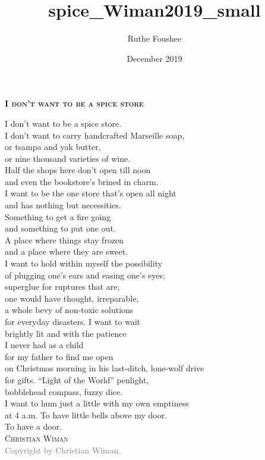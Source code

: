 \documentclass[12pt]{memoir}
\title{spice_Wiman2019_small}
\author{Ruthe Foushee}
\date{December 2019}
\begin{document}
\thispagestyle{empty}
\textbf{\textsc{\large I don't want to be a spice store}}
\vspace{32pt}

I don't want to be a spice store.\\
I don't want to carry handcrafted Marseille soap,\\
or tsampa and yak butter,\\
or nine thousand varieties of wine.\\
Half the shops here don't open till noon\\
and even the bookstore's brined in charm.\\
I want to be the one store that's open all night\\
and has nothing but necessities.\\
Something to get a fire going\\
and something to put one out.\\
A place where things stay frozen\\
and a place where they are sweet.\\
I want to hold within myself the possibility\\
of plugging one's ears and easing one's eyes;\\
superglue for ruptures that are,\\
one would have thought, irreparable,\\
a whole bevy of non-toxic solutions\\
for everyday disasters. I want to wait\\
brightly lit and with the patience\\
I never had as a child\\
for my father to find me open\\
on Christmas morning in his last-ditch, lone-wolf drive\\
for gifts. ``Light of the World'' penlight,\\
bobblehead compass, fuzzy dice.\\
I want to hum just a little with my own emptiness\\
at 4 a.m. To have little bells above my door.\\
To have a door.\\

\vspace{12pt}
\hspace{90pt} \textsc{Christian Wiman}\\
\vfill
\noindent\footnotesize{
\textcolor{gray}{Copyright  by Christian Wiman.}}\\ 
\end{document}
